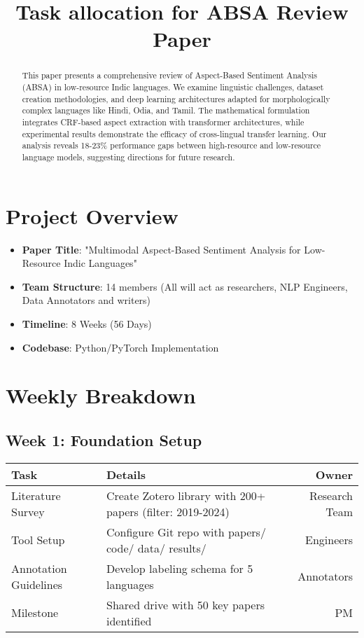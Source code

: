 \documentclass[]{article}
\title{Task allocation for ABSA Review Paper}
\author{}
\begin{document}
\maketitle

\begin{abstract}

This paper presents a comprehensive review of Aspect-Based Sentiment Analysis (ABSA) in low-resource Indic languages. We examine linguistic challenges, dataset creation methodologies, and deep learning architectures adapted for morphologically complex languages like Hindi, Odia, and Tamil. The mathematical formulation integrates CRF-based aspect extraction with transformer architectures, while experimental results demonstrate the efficacy of cross-lingual transfer learning. Our analysis reveals 18-23\% performance gaps between high-resource and low-resource language models, suggesting directions for future research.
\end{abstract}
\section{Project Overview}
\begin{itemize}
    \item \textbf{Paper Title}: "Multimodal Aspect-Based Sentiment Analysis for Low-Resource Indic Languages"
    \item \textbf{Team Structure}: 14 members (All will act as researchers, NLP Engineers, Data Annotators and writers)
    \item \textbf{Timeline}: 8 Weeks (56 Days)
    \item \textbf{Codebase}: Python/PyTorch Implementation
\end{itemize}
\section{Weekly Breakdown}
\subsection*{Week 1: Foundation Setup}
\begin{table}[h!]
\centering
\begin{tabularx}{\textwidth}{|l|X|r|}
\hline
\textbf{Task} & \textbf{Details} & \textbf{Owner} \\ \hline
Literature Survey & Create Zotero library with 200+ papers (filter: 2019-2024) & Research Team \\ \hline
Tool Setup & Configure Git repo with papers/ code/ data/ results/ & Engineers \\ \hline
Annotation Guidelines & Develop labeling schema for 5 languages & Annotators \\ \hline
Milestone & Shared drive with 50 key papers identified & PM \\ \hline
\end{tabularx}
\end{table}
\end{document}
